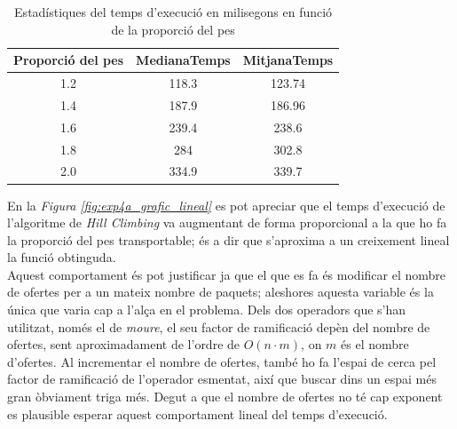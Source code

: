 \documentclass[a4paper]{article}
\begin{document}
		\begin{table}[H]
		\centering
		\begin{tabular}{|c|c|c|}
			\hline
			\textbf{Proporció del pes} & \textbf{MedianaTemps} & \textbf{MitjanaTemps} \\
			\hline
			1.2 & 118.3 & 123.74\\
			\hline
			1.4 & 187.9 & 186.96\\
			\hline
			1.6 & 239.4 & 238.6\\
			\hline
			1.8 & 284 & 302.8\\
			\hline
			2.0 & 334.9 & 339.7\\
			\hline
		\end{tabular}
		\caption{Estadístiques del temps d'execució en milisegons en funció de la proporció del pes}
		\label{tab:exp4a_taula}
	\end{table}
	
	En la \textit{Figura \ref{fig:exp4a_grafic_lineal}} es pot apreciar que el temps d'execució de l'algoritme de \textit{Hill Climbing} va augmentant de forma proporcional a la que ho fa la proporció del pes transportable; és a dir que s'aproxima a un creixement lineal la funció obtinguda. \\
	Aquest comportament és pot justificar ja que el que es fa és modificar el nombre de ofertes per a un mateix nombre de paquets; aleshores aquesta variable és la única que varia cap a l'alça en el problema. Dels dos  operadors que s'han utilitzat, només el de \textit{moure}, el seu factor de ramificació depèn del nombre de ofertes, sent aproximadament de l'ordre de $O(n \cdot m)$, on $m$ és el nombre d'ofertes. Al incrementar el nombre de ofertes, també ho fa l'espai de cerca pel factor de ramificació de l'operador esmentat, així que buscar dins un espai més gran òbviament triga més. Degut a que el nombre de ofertes no té cap exponent es plausible esperar aquest comportament lineal del temps d'execució. 
\end{document}
